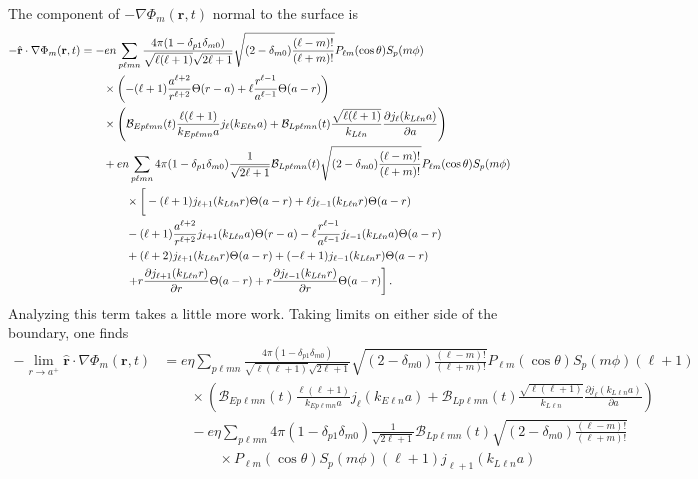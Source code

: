 \documentclass{article}
\begin{document}
The component of $-\nabla\Phi_m(\mathbf{r},t)$ normal to the surface is
\begin{equation}
\begin{split}
-\hat{\mathbf{r}}\cdot\nabla\Phi_m(\mathbf{r},t) &= -en\sum_{p\ell mn}\frac{4\pi(1 - \delta_{p1}\delta_{m0})}{\sqrt{\ell(\ell + 1)}\sqrt{2\ell + 1}}\sqrt{(2 - \delta_{m0})\frac{(\ell - m)!}{(\ell + m)!}}P_{\ell m}(\cos\theta)S_p(m\phi)\\
&\qquad\times\left(-(\ell + 1)\frac{a^{\ell + 2}}{r^{\ell + 2}}\Theta(r - a) + \ell\frac{r^{\ell - 1}}{a^{\ell - 1}}\Theta(a - r)\right)\\
&\qquad\times\left(\mathcal{B}_{Ep\ell mn}(t)\frac{\ell(\ell + 1)}{k_{Ep\ell mn}a}j_\ell(k_{E\ell n}a) + \mathcal{B}_{Lp\ell mn}(t)\frac{\sqrt{\ell(\ell + 1)}}{k_{L\ell n}}\frac{\partial j_{\ell}(k_{L\ell n}a)}{\partial a}\right)\\
&\qquad + en\sum_{p\ell mn}4\pi(1 - \delta_{p1}\delta_{m0})\frac{1}{\sqrt{2\ell + 1}}\mathcal{B}_{Lp\ell mn}(t)\sqrt{(2 - \delta_{m0})\frac{(\ell - m)!}{(\ell + m)!}}P_{\ell m}(\cos\theta)S_p(m\phi)\\
&\qquad\qquad\times\left[ \vphantom{\frac{\partial}{\partial r}} -(\ell + 1)j_{\ell + 1}(k_{L\ell n}r)\Theta(a - r) + \ell j_{\ell - 1}(k_{L\ell n}r)\Theta(a - r)\right.\\
&\qquad\qquad - (\ell + 1)\frac{a^{\ell + 2}}{r^{\ell + 2}}j_{\ell + 1}(k_{L\ell n}a)\Theta(r - a) - \ell\frac{r^{\ell - 1}}{a^{\ell - 1}}j_{\ell - 1}(k_{L\ell n}a)\Theta(a - r)\\
&\qquad\qquad + (\ell + 2)j_{\ell + 1}(k_{L\ell n}r)\Theta(a - r) + (-\ell + 1)j_{\ell - 1}(k_{L\ell n}r)\Theta(a - r)\\
&\qquad\qquad\left. + r\frac{\partial j_{\ell + 1}(k_{L\ell n}r)}{\partial r}\Theta(a - r) + r\frac{\partial j_{\ell - 1}(k_{L\ell n}r)}{\partial r}\Theta(a - r)\right].
\end{split}
\end{equation}
Analyzing this term takes a little more work. Taking limits on either side of the boundary, one finds
\begin{equation}
\begin{split}
-\lim_{r\to a^+}\hat{\mathbf{r}}\cdot\nabla\Phi_m(\mathbf{r},t) &= e\eta\sum_{p\ell mn}\frac{4\pi(1 - \delta_{p1}\delta_{m0})}{\sqrt{\ell(\ell + 1)}\sqrt{2\ell + 1}}\sqrt{(2 - \delta_{m0})\frac{(\ell - m)!}{(\ell + m)!}}P_{\ell m}(\cos\theta)S_p(m\phi)(\ell + 1)\\
&\qquad\times\left(\mathcal{B}_{Ep\ell mn}(t)\frac{\ell(\ell + 1)}{k_{Ep\ell mn}a}j_\ell(k_{E\ell n}a) + \mathcal{B}_{Lp\ell mn}(t)\frac{\sqrt{\ell(\ell + 1)}}{k_{L\ell n}}\frac{\partial j_{\ell}(k_{L\ell n}a)}{\partial a}\right)\\
&\qquad - e\eta\sum_{p\ell mn}4\pi(1 - \delta_{p1}\delta_{m0})\frac{1}{\sqrt{2\ell + 1}}\mathcal{B}_{Lp\ell mn}(t)\sqrt{(2 - \delta_{m0})\frac{(\ell - m)!}{(\ell + m)!}}\\
&\qquad\qquad\times P_{\ell m}(\cos\theta)S_p(m\phi)(\ell + 1)j_{\ell + 1}(k_{L\ell n}a)
\end{split}
\end{equation}
\end{document}
